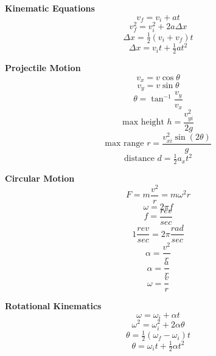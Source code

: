 \documentclass[12pt]{article}
\begin{document}
\begin{minipage}[t]{.5\textwidth}
\textbf{\large{Kinematic Equations}} \\
	\[v_f = v_i + at\]\vspace{-9pt}
	\[v_f^2 = v_i^2 + 2a \Delta x\]\vspace{-9pt}
	\[\Delta x = \tfrac{1}{2}(v_i + v_f)t\]\vspace{-9pt}
	\[\Delta x = v_i t + \tfrac{1}{2} at^2\]

\end{minipage}
\begin{minipage}[t]{.5\textwidth}
\textbf{\large{Projectile Motion}} \\
	\[v_x = v \cos \theta \]
	\[v_y = v \sin \theta \]
	\[\theta = \tan ^{-1} \frac{v_y}{v_x} \]
	\[\text{max height   } h = \frac{v_{yi}^2}{2g} \]
	\[\text{max range   } r = \frac{v_{xi}^2 \sin(2\theta)}{g} \]
	\[\text{distance    } d = \tfrac{1}{2} a_x t^2\]

\end{minipage}\vspace{12pt}
\begin{minipage}[t]{.5\textwidth}
\textbf{\large{Circular Motion}} \\
	\[F = m \frac{v^2}{r} = m\omega^2 r \]
	\[\omega = 2\pi f \]
	\[f = \frac{rev}{sec} \]
	\[1 \frac{rev}{sec} = 2\pi \frac{rad}{sec} \]
	\[\alpha = \frac{v^2}{r} \]
	\[\alpha = \frac{a}{r} \]
	\[\omega = \frac{v}{r} \]

\end{minipage}
\begin{minipage}[t]{.5\textwidth}
\textbf{\large{Rotational Kinematics}} \\
	\[\omega = \omega_i +\alpha t \]
	\[\omega^2 = \omega_i^2 + 2\alpha \theta \]
	\[\theta = \tfrac{1}{2} (\omega_f - \omega_i) t \]
	\[\theta = \omega_i t + \tfrac{1}{2} \alpha t^2 \]


\end{minipage}
\end{document}
